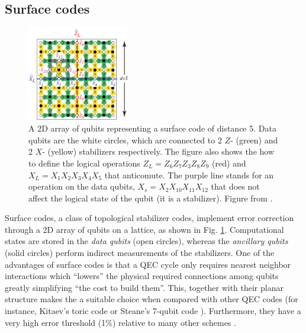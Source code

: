 \subsection{Surface codes}
\begin{figure}
  \centering
  \includegraphics[width=0.4\textwidth]{images/surface_code.png}
  \caption{A 2D array of qubits representing a surface code of distance 5. Data
    qubits are the white circles, which are connected to 2 $Z$- (green) and 2
    $X$- (yellow) stabilizers respectively. The figure also shows the how to
    define the logical operations $Z_L = Z_6Z_7Z_3Z_8Z_9$ (red) and $X_L =
    X_1X_2X_3X_4X_5$ that anticomute. The purple line stands for an operation on
    the data qubits, $X_s = X_2 X_{10}X_{11} X_{12} $ that does not affect the
    logical state of the qubit (it is a stabilizer). Figure from
    \cite{fowler12_surfac_codes}.}
  \label{fig:surface_code}
\end{figure}

Surface codes, a class of topological stabilizer codes, implement error
correction through a 2D array of qubits on a lattice, as shown in Fig.
\ref{fig:surface_code}. Computational states are stored in the \textit{data
  qubits} (open circles), whereas the \textit{ancillary qubits} (solid circles)
perform indirect measurements of the stabilizers. One of the advantages of
surface codes is that a QEC cycle only requires nearest neighbor interactions
which ``lowers'' the physical required connections among qubits greatly
simplifying ``the cost to build them''. This, together with their planar
structure makes the a suitable choice when compared with other QEC codes (for
instance, Kitaev's toric code \cite{Kitaev_2003} or Steane's 7-qubit code
\cite{Steane_1996_QEC}). Furthermore, they have a very high error threshold
(1\%) relative to many other schemes \cite{terhal15}.


